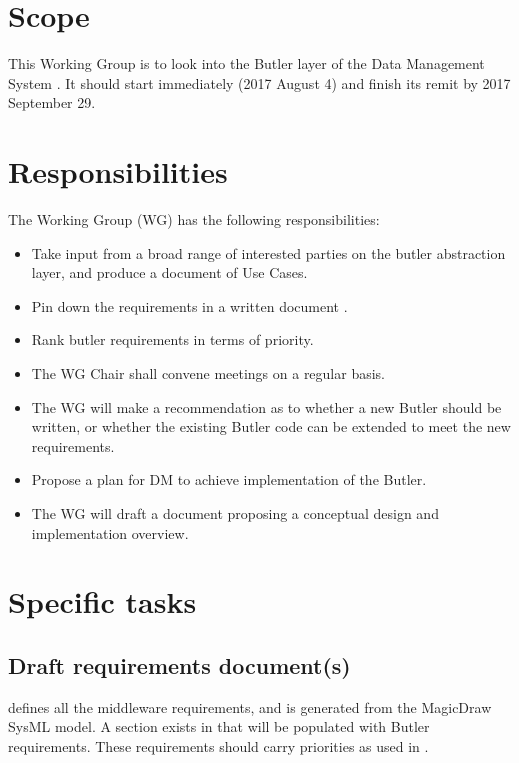 \section{Scope}

This Working Group is to look into the Butler layer of the Data Management System .
It should start immediately (2017 August 4) and finish its remit by 2017 September 29.


\section{Responsibilities}

The Working Group (WG) has the following responsibilities:

\begin{itemize}
 \item Take input from a broad range of interested parties on the butler abstraction layer, and produce a document of Use Cases.
 \item Pin down the requirements in a written document .
 \item Rank butler requirements in terms of priority.
 \item The WG Chair shall convene meetings on a regular basis.
 \item The WG will make a recommendation as to whether a new Butler should be written, or whether the existing Butler code can be extended to meet the new requirements.
 \item Propose a plan for DM to achieve implementation of the Butler.
 \item The WG will draft a document proposing a conceptual design and implementation overview.
\end{itemize}

\section{Specific tasks}

\subsection{Draft requirements document(s)}

 defines all the middleware requirements, and is generated from the MagicDraw SysML model.
A section exists in  that will be populated with Butler requirements.
These requirements should carry priorities as used in .

